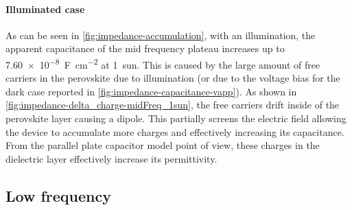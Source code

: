 		\paragraph{Illuminated case}
		As can be seen in \cref{fig:impedance-accumulation}, with an illumination, the apparent capacitance of the mid frequency plateau increases up to \SI{7.60e-8}{\farad\per\square\cm} at \SI{1}{sun}.
		This is caused by the large amount of free carriers in the perovskite due to illumination (or due to the voltage bias for the dark case reported in \cref{fig:impedance-capacitance-vapp}).
		As shown in \cref{fig:impedance-delta_charge-midFreq_1sun}, the free carriers drift inside of the perovskite layer causing a dipole.
		This partially screens the electric field allowing the device to accumulate more charges and effectively increasing its capacitance.
		From the parallel plate capacitor model point of view, these charges in the dielectric layer effectively increase its permittivity.

		\begin{figure}%
		\end{figure}



	\subsection{Low frequency}

